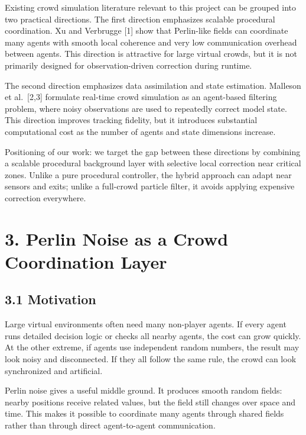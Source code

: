 \documentclass[
  11pt,
]{article}
\begin{document}
Existing crowd simulation literature relevant to this project can be
grouped into two practical directions. The first direction emphasizes
scalable procedural coordination. Xu and Verbrugge {[}1{]} show that
Perlin-like fields can coordinate many agents with smooth local
coherence and very low communication overhead between agents. This
direction is attractive for large virtual crowds, but it is not
primarily designed for observation-driven correction during runtime.

The second direction emphasizes data assimilation and state estimation.
Malleson et al.~{[}2,3{]} formulate real-time crowd simulation as an
agent-based filtering problem, where noisy observations are used to
repeatedly correct model state. This direction improves tracking
fidelity, but it introduces substantial computational cost as the number
of agents and state dimensions increase.

Positioning of our work: we target the gap between these directions by
combining a scalable procedural background layer with selective local
correction near critical zones. Unlike a pure procedural controller, the
hybrid approach can adapt near sensors and exits; unlike a full-crowd
particle filter, it avoids applying expensive correction everywhere.

\section{3. Perlin Noise as a Crowd Coordination
Layer}\label{perlin-noise-as-a-crowd-coordination-layer}

\subsection{3.1 Motivation}\label{motivation}

Large virtual environments often need many non-player agents. If every
agent runs detailed decision logic or checks all nearby agents, the cost
can grow quickly. At the other extreme, if agents use independent random
numbers, the result may look noisy and disconnected. If they all follow
the same rule, the crowd can look synchronized and artificial.

Perlin noise gives a useful middle ground. It produces smooth random
fields: nearby positions receive related values, but the field still
changes over space and time. This makes it possible to coordinate many
agents through shared fields rather than through direct agent-to-agent
communication.
\end{document}
